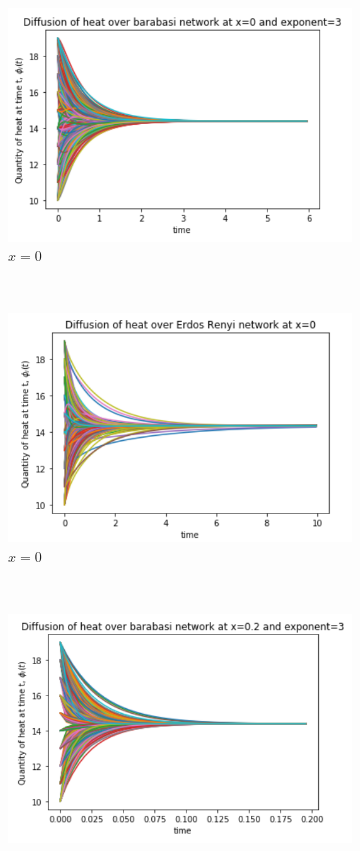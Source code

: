 \documentclass[10pt,a4paper]{article}
\begin{document}
\begin{figure}[H]
	\centering
	\begin{subfigure}[b]{0.45\textwidth}
		\includegraphics[width=\textwidth]{images/barabasi-x0.png}
		\caption{$x=0$}
		\label{barabasi-x0}
	\end{subfigure}~
	\begin{subfigure}[b]{0.45\textwidth}
		\includegraphics[width= \textwidth]{images/erdos-x0.png}
		\caption{$x=0$}
		\label{erdos-x01}
	\end{subfigure}\\
	\begin{subfigure}[b]{0.45\textwidth}
		\includegraphics[width= \textwidth]{images/barabasi-x02.png}

\end{subfigure}
\end{figure}
\end{document}
